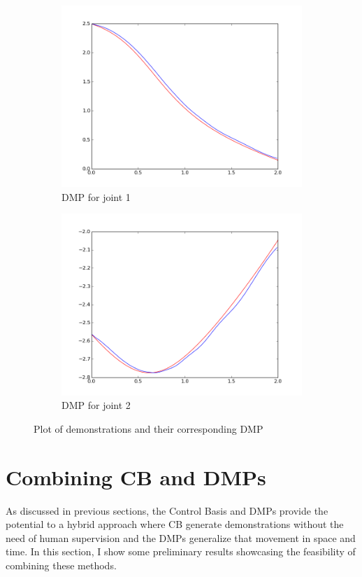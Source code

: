 \documentclass[a4paper]{article}
\begin{document}
 
\begin{figure}
\centering
\begin{subfigure}{.5\textwidth}
  \centering
  \includegraphics[width=.8\linewidth]{figure_1.png}
  \caption{DMP for joint 1}
  \label{fig:sub1}
\end{subfigure}%
\begin{subfigure}{.5\textwidth}
  \centering
  \includegraphics[width=.8\linewidth]{figure_2.png}
  \caption{DMP for joint 2}
  \label{fig:sub2}
\end{subfigure}
\caption{Plot of demonstrations and their corresponding DMP}
\label{fig:test}
\end{figure}

\section{Combining CB and DMPs}

\indent \indent As discussed in previous sections, the Control Basis and DMPs provide the potential to a hybrid approach where CB generate demonstrations without the need of human supervision and the DMPs generalize that movement in space and time. In this section, I show some preliminary results showcasing the feasibility of combining these methods. \\
\end{document}
